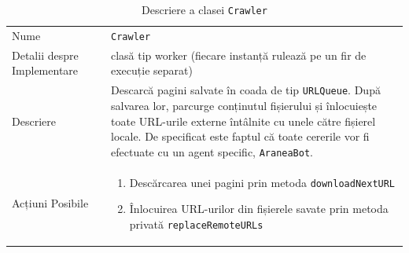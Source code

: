 \documentclass[12pt]{article}
\begin{document}
\begin{table}[H]
    \centering
    \begin{tabular}{ |p{0.25\linewidth} | p{0.75\linewidth}| } 
        \hline
        Nume & \texttt{Crawler} \\
        Detalii despre Implementare & clasă tip worker (fiecare instanță rulează pe un fir de execuție separat) \\
        Descriere & Descarcă pagini salvate în coada de tip \texttt{URLQueue}. După salvarea lor, parcurge conținutul fișierului și înlocuiește toate URL-urile externe întâlnite cu unele către fișierel locale.  De specificat este faptul că toate cererile vor fi efectuate cu un agent specific, \texttt{AraneaBot}.\\
        Acțiuni Posibile & \begin{enumerate}
                               \item Descărcarea unei pagini prin metoda \texttt{downloadNextURL}
                               \item Înlocuirea URL-urilor din fișierele savate prin metoda privată \texttt{replaceRemoteURLs}
                           \end{enumerate} \\
        \hline
    \end{tabular}
    \caption{Descriere a clasei \texttt{Crawler}}
    \label{table:1}
\end{table}

\newpage
\end{document}
